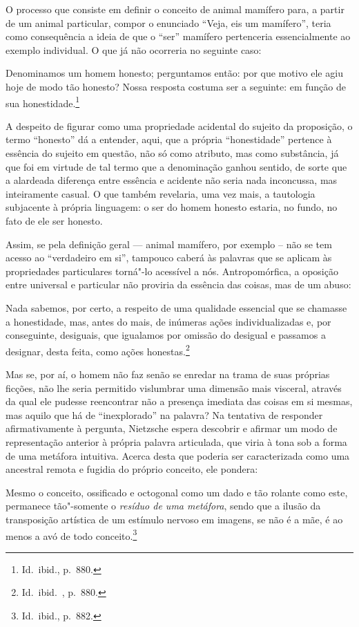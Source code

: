 O processo que consiste em definir o conceito de animal mamífero para,
a partir de um animal particular, compor o enunciado “Veja,
eis um mamífero”, teria como consequência a ideia de que o “ser”
mamífero pertenceria essencialmente ao exemplo individual. O que já não
ocorreria no seguinte caso: 
\begin{hedraquote}
Denominamos um homem honesto; perguntamos então: 
por que motivo ele agiu hoje de modo tão
honesto? Nossa resposta costuma ser a seguinte: em função de sua
honestidade.\footnote{ Id.~ibid., p.~880.} 
\end{hedraquote}
A despeito de
figurar como uma propriedade acidental do sujeito da proposição, o
termo “honesto” dá a entender, aqui, que a própria “honestidade”
pertence à essência do sujeito em questão, não só como atributo, mas
como substância, já que foi em virtude de tal termo que a denominação
ganhou sentido, de sorte que a alardeada diferença entre essência e
acidente não seria nada inconcussa, mas inteiramente casual. O que
também revelaria, uma vez mais, a tautologia subjacente à própria
linguagem: o ser do homem honesto estaria, no fundo, no fato de ele ser
honesto.

Assim, se pela definição geral --- animal mamífero, por exemplo -- não se
tem acesso ao “verdadeiro em si”, tampouco caberá às palavras
que se aplicam às propriedades particulares torná"-lo acessível a nós.
Antropomórfica, a oposição entre universal e particular não proviria da
essência das coisas, mas de um abuso: 
\begin{hedraquote}
Nada sabemos, por
certo, a respeito de uma qualidade essencial que se chamasse a
honestidade, mas, antes do mais, de inúmeras ações individualizadas e,
por conseguinte, desiguais, que igualamos por omissão do desigual e
passamos a designar, desta feita, como ações
honestas.\footnote{ Id.~ibid.~, p.~880.}
\end{hedraquote}
Mas se, por aí, o homem não faz senão se enredar na trama de suas
próprias ficções, não lhe seria permitido vislumbrar uma dimensão mais
visceral, através da qual ele pudesse reencontrar não a presença
imediata das coisas em si mesmas, mas aquilo que há de “inexplorado” na
palavra? Na tentativa de responder afirmativamente à pergunta,
Nietzsche espera descobrir e afirmar um modo de representação anterior
à própria palavra articulada, que viria à tona sob a forma de uma
metáfora intuitiva. Acerca desta que poderia ser caracterizada como uma
ancestral remota e fugidia do próprio conceito, ele pondera: 
\begin{hedraquote}
Mesmo o
conceito, ossificado e octogonal como um dado e tão rolante como este,
permanece tão"-somente o \textit{resíduo de uma metáfora}, sendo que a
ilusão da transposição artística de um estímulo nervoso em imagens, se
não é a mãe, é ao menos a avó de todo conceito.\footnote{ Id.~ibid.,
p.~882. }
\end{hedraquote}

